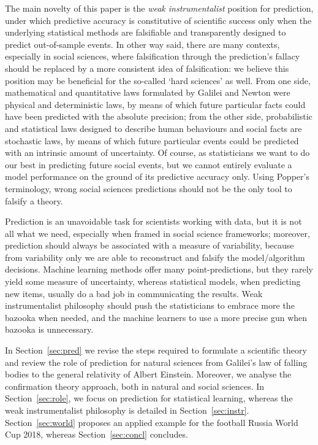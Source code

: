\documentclass{statsoc}
\begin{document}
The main novelty of this paper is the \emph{weak instrumentalist} position for prediction, under which predictive accuracy is constitutive of scientific success only when the 
underlying statistical methods are falsifiable and transparently designed to predict out-of-sample events.  In other way said, there are many contexts, especially in social sciences, where falsification through the prediction's fallacy should be replaced by a more consistent idea of falsification: we believe this position may be beneficial for the so-called `hard sciences' as well.  From one side, mathematical and quantitative laws formulated by Galilei and Newton 
were physical and deterministic laws, by means of which future particular facts could have been predicted with the absolute precision; from the other side, probabilistic and statistical laws designed 
to describe human behaviours and social facts are stochastic laws, by means of which future particular events could be predicted with an intrinsic amount of uncertainty. 
Of course, as statisticians we want to do our best in predicting future social events, but we cannot entirely evaluate a model performance on the ground of its predictive accuracy only. Using Popper's terminology, wrong social sciences predictions should not be the only tool to falsify a theory.

Prediction is an unavoidable task for scientists working 
with data, but it is not all what we need, especially when framed in social science frameworks; moreover, prediction should always be associated with a measure of variability, because from variability only we are able to reconstruct and 
falsify the model/algorithm decisions. Machine learning methods offer many point-predictions,  but they rarely yield some measure of uncertainty, whereas statistical 
models, when predicting new items, usually do a bad job in communicating the results. Weak instrumentalist philosophy should push the statisticians to embrace more the bazooka when needed, and the machine learners to use a more precise gun when bazooka is unnecessary.

In Section~\ref{sec:pred} we revise the steps required to formulate a scientific theory and review the role of prediction for natural sciences from Galilei's law of falling bodies to 
the general relativity of Albert Einstein. Moreover, we analyse the confirmation theory approach, both in natural and social sciences. In Section~\ref{sec:role}, we focus on 
prediction for statistical learning, whereas the weak instrumentalist philosophy is detailed in Section~\ref{sec:instr}. Section~\ref{sec:world} proposes an applied example for the football Russia World Cup 2018, whereas Section~\ref{sec:concl} concludes.
\end{document}

